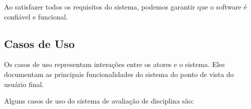 Ao satisfazer todos os requisitos do sistema, podemos garantir que o software é confiável e funcional. 

\subsection{Casos de Uso}
Os casos de uso representam interações entre os atores e o sistema. Eles documentam as principais funcionalidades do sistema do ponto de vista do usuário final. 


Alguns casos de uso do sistema de avaliação de disciplina são:

